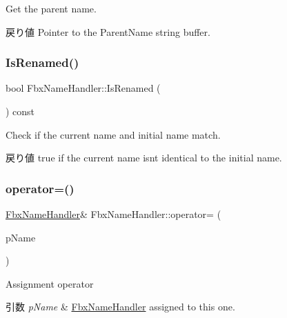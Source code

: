 Get the parent name. \begin{DoxyReturn}{戻り値}
Pointer to the Parent\+Name string buffer. 
\end{DoxyReturn}
\mbox{\label{class_fbx_name_handler_a9b68199866bcb0fb01709d02d3d064c2}} 
\subsubsection{\texorpdfstring{Is\+Renamed()}{IsRenamed()}}
{\footnotesize\ttfamily bool Fbx\+Name\+Handler\+::\+Is\+Renamed (\begin{DoxyParamCaption}{ }\end{DoxyParamCaption}) const}

Check if the current name and initial name match. \begin{DoxyReturn}{戻り値}
{\ttfamily true} if the current name isn\textquotesingle{}t identical to the initial name. 
\end{DoxyReturn}
\mbox{\label{class_fbx_name_handler_addc63ffad614f6008022b6eb06a57b6d}} 
\subsubsection{\texorpdfstring{operator=()}{operator=()}}
{\footnotesize\ttfamily \hyperlink{class_fbx_name_handler}{Fbx\+Name\+Handler}\& Fbx\+Name\+Handler\+::operator= (\begin{DoxyParamCaption}\item[{\hyperlink{class_fbx_name_handler}{Fbx\+Name\+Handler} const \&}]{p\+Name }\end{DoxyParamCaption})}

Assignment operator 
\begin{DoxyParams}{引数}
{\em p\+Name} & \hyperlink{class_fbx_name_handler}{Fbx\+Name\+Handler} assigned to this one. \\
\hline
\end{DoxyParams}
\mbox{\label{class_fbx_name_handler_afea94fddf5deb3141f8371d8b858336c}} 
